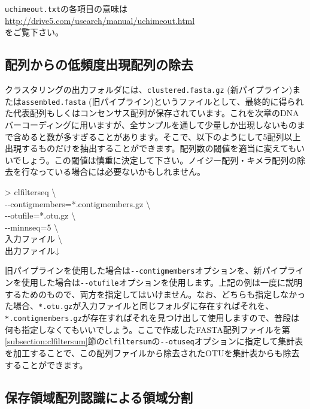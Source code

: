 \documentclass[titlepage,10pt,a4paper]{jsbook}
\newenvironment{cmd}{\begin{oframed}\raggedright\ttfamily\footnotesize\setlength{\baselineskip}{1.4em}}{\end{oframed}\vspace{-1em}}
\begin{document}
\texttt{uchimeout.txt}の各項目の意味は\\
\href{http://drive5.com/usearch/manual/uchimeout.html}{http://drive5.com/usearch/manual/uchimeout.html}\\
をご覧下さい。

\subsection{配列からの低頻度出現配列の除去}

クラスタリングの出力フォルダには、\texttt{clustered.fasta.gz} (新パイプライン)または\texttt{assembled.fasta} (旧パイプライン)というファイルとして、最終的に得られた代表配列もしくはコンセンサス配列が保存されています。これを次章のDNAバーコーディングに用いますが、全サンプルを通して少量しか出現しないものまで含めると数が多すぎることがあります。そこで、以下のようにして5配列以上出現するものだけを抽出することができます。配列数の閾値を適当に変えてもいいでしょう。この閾値は慎重に決定して下さい。ノイジー配列・キメラ配列の除去を行なっている場合には必要ないかもしれません。
\begin{cmd}
{\textgreater} clfilterseq {\textbackslash}\\
{-}{-}contigmembers=*.contigmembers.gz {\textbackslash}\\
{-}{-}otufile=*.otu.gz {\textbackslash}\\
{-}{-}minnseq=5 {\textbackslash}\\
入力ファイル {\textbackslash}\\
出力ファイル↓
\end{cmd}
旧パイプラインを使用した場合は\texttt{{-}{-}contigmembers}オプションを、新パイプラインを使用した場合は\texttt{{-}{-}otufile}オプションを使用します。上記の例は一度に説明するためのもので、両方を指定してはいけません。なお、どちらも指定しなかった場合、\texttt{*.otu.gz}が入力ファイルと同じフォルダに存在すればそれを、\texttt{*.contigmembers.gz}が存在すればそれを見つけ出して使用しますので、普段は何も指定しなくてもいいでしょう。ここで作成したFASTA配列ファイルを第\ref{subsection:clfiltersum}節の\texttt{clfiltersum}の\texttt{{-}{-}otuseq}オプションに指定して集計表を加工することで、この配列ファイルから除去されたOTUを集計表からも除去することができます。

\subsection{保存領域配列認識による領域分割}
\end{document}
